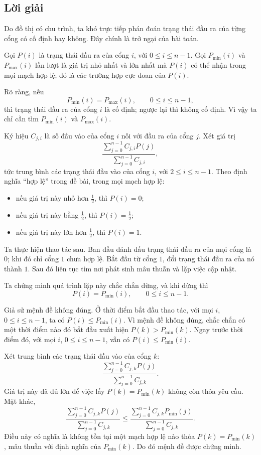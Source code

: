 \documentclass[11pt]{article}
\begin{document}
\subsection{Lời giải}

Do đồ thị có chu trình, ta khó trực tiếp phán đoán trạng thái đầu ra của từng
cổng có cố định hay không. Đây chính là trở ngại của bài toán.

Gọi \(P(i)\) là trạng thái đầu ra của cổng \(i\), với
\(0\le i\le n-1\). Gọi \(P_{\min}(i)\) và \(P_{\max}(i)\) lần lượt là giá trị
nhỏ nhất và lớn nhất mà \(P(i)\) có thể nhận trong mọi mạch hợp lệ; đó là các
trường hợp cực đoan của \(P(i)\).

Rõ ràng, nếu
\[
  P_{\min}(i)=P_{\max}(i),\qquad 0\le i\le n-1,
\]
thì trạng thái đầu ra của cổng \(i\) là cố định; ngược lại thì không cố định.
Vì vậy ta chỉ cần tìm \(P_{\min}(i)\) và \(P_{\max}(i)\).

Ký hiệu \(C_{j,i}\) là số đầu vào của cổng \(i\) nối với đầu ra của cổng \(j\).
Xét giá trị
\[
  \frac{\sum_{j=0}^{n-1} C_{j,i}P(j)}
       {\sum_{j=0}^{n-1} C_{j,i}},
\]
tức trung bình các trạng thái đầu vào của cổng \(i\), với
\(2\le i\le n-1\). Theo định nghĩa ``hợp lệ'' trong đề bài, trong mọi mạch hợp
lệ:
\begin{itemize}
  \item nếu giá trị này nhỏ hơn \(\frac12\), thì \(P(i)=0\);
  \item nếu giá trị này bằng \(\frac12\), thì \(P(i)=\frac12\);
  \item nếu giá trị này lớn hơn \(\frac12\), thì \(P(i)=1\).
\end{itemize}

Ta thực hiện thao tác sau. Ban đầu đánh dấu trạng thái đầu ra của mọi cổng là
\(0\); khi đó chỉ cổng \(1\) chưa hợp lệ. Bắt đầu từ cổng \(1\), đổi trạng thái
đầu ra của nó thành \(1\). Sau đó liên tục tìm nơi phát sinh mâu thuẫn và lặp
việc cập nhật.

Ta chứng minh quá trình lặp này chắc chắn dừng, và khi dừng thì
\[
  P(i)=P_{\min}(i),\qquad 0\le i\le n-1.
\]

Giả sử mệnh đề không đúng. Ở thời điểm bắt đầu thao tác, với mọi
\(i\), \(0\le i\le n-1\), ta có \(P(i)\le P_{\min}(i)\). Vì mệnh đề không
đúng, chắc chắn có một thời điểm nào đó bắt đầu xuất hiện
\(P(k)>P_{\min}(k)\). Ngay trước thời điểm đó, với mọi
\(i\), \(0\le i\le n-1\), vẫn có \(P(i)\le P_{\min}(i)\).

Xét trung bình các trạng thái đầu vào của cổng \(k\):
\[
  \frac{\sum_{j=0}^{n-1} C_{j,k}P(j)}
       {\sum_{j=0}^{n-1} C_{j,k}}.
\]
Giá trị này đã đủ lớn để việc lấy \(P(k)=P_{\min}(k)\) không còn thỏa yêu cầu.
Mặt khác,
\[
  \frac{\sum_{j=0}^{n-1} C_{j,k}P(j)}
       {\sum_{j=0}^{n-1} C_{j,k}}
  \le
  \frac{\sum_{j=0}^{n-1} C_{j,k}P_{\min}(j)}
       {\sum_{j=0}^{n-1} C_{j,k}}.
\]
Điều này có nghĩa là không tồn tại một mạch hợp lệ nào thỏa
\(P(k)=P_{\min}(k)\), mâu thuẫn với định nghĩa của \(P_{\min}(k)\). Do đó mệnh
đề được chứng minh.
\end{document}
